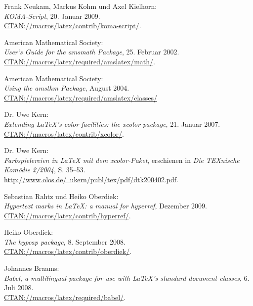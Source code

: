 \documentclass{exercise}
\begin{document}
  \begin{thebibliography}{22}
     Frank Neukam, Markus Kohm und Axel Kielhorn: \\
    \emph{KOMA-Script}, 20. Januar 2009. \\
    \href{http://mirror.ctan.org/macros/latex/contrib/koma-script/}{CTAN://macros/latex/contrib/koma-script/}.

     American Mathematical Society: \\
    \emph{User's Guide for the amsmath Package}, 25. Februar 2002. \\
    \href{http://mirror.ctan.org/macros/latex/required/amslatex/math/}{CTAN://macros/latex/required/amslatex/math/}.

     American Mathematical Society: \\
    \emph{Using the amsthm Package}, August 2004. \\
    \href{http://mirror.ctan.org/macros/latex/required/amslatex/classes/}{CTAN://macros/latex/required/amslatex/classes/}

     Dr. Uwe Kern: \\
    \emph{Extending \LaTeX's color facilities: the xcolor package}, 21. Januar 2007. \\
    \href{http://mirror.ctan.org/macros/latex/contrib/xcolor/}{CTAN://macros/latex/contrib/xcolor/}.

     Dr. Uwe Kern: \\
    \emph{Farbspielereien in \LaTeX{} mit dem xcolor-Paket}, erschienen in \emph{Die TEXnische Komödie 2/2004}, S. 35–53. \\
    \href{http://www.olos.de/~ukern/publ/tex/pdf/dtk200402.pdf}{http://www.olos.de/~ukern/publ/tex/pdf/dtk200402.pdf}.

     Sebastian Rahtz und Heiko Oberdiek: \\
    \emph{Hypertext marks in \LaTeX{}: a manual for hyperref}, Dezember 2009. \\
    \href{http://mirror.ctan.org/macros/latex/contrib/hyperref/}{CTAN://macros/latex/contrib/hyperref/}.

     Heiko Oberdiek: \\
    \emph{The hypcap package}, 8. September 2008. \\
    \href{http://mirror.ctan.org/macros/latex/contrib/oberdiek/}{CTAN://macros/latex/contrib/oberdiek/}.

     Johannes Braams: \\
    \emph{Babel, a multilingual package for use with \LaTeX{}'s standard document classes}, 6. Juli 2008. \\
    \href{http://mirror.ctan.org/macros/latex/required/babel/}{CTAN://macros/latex/required/babel/}.


\end{thebibliography}
\end{document}
